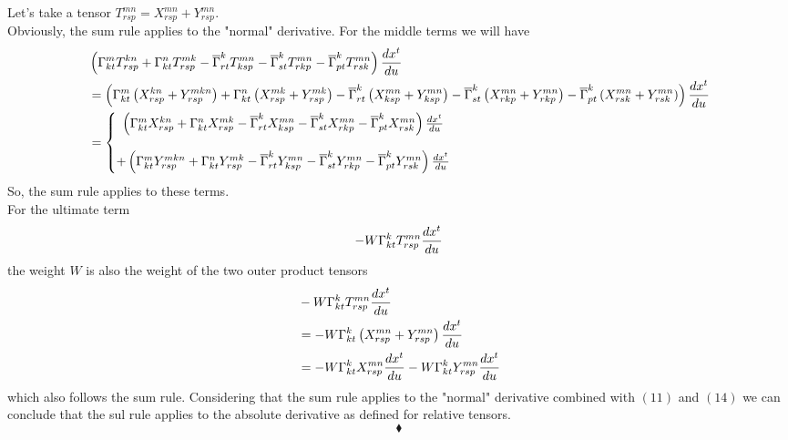 Let's take a tensor $T^{mn}_{rsp} =X^{mn}_{rsp}+Y^{mn}_{rsp}$.\\
Obviously, the sum rule applies to the "normal" derivative.
For the middle terms we will have
\begin{align}
&\left(\Gamma^m_{kt}T^{kn}_{rsp}+\Gamma^n_{kt}T^{mk}_{rsp}-\overline{\Gamma}^k_{rt}T^{mn}_{ksp} -\overline{\Gamma}^k_{st}T^{mn}_{rkp} -\overline{\Gamma}^k_{pt}T^{mn}_{rsk} \right)\dv{x^t}{u}\\
&= \left(\Gamma^m_{kt}\left(X^{kn}_{rsp}+Y^{mkn}_{rsp}\right)+\Gamma^n_{kt}\left(X^{mk}_{rsp}+Y^{mk}_{rsp}\right)-\overline{\Gamma}^k_{rt}\left(X^{mn}_{ksp}+Y^{mn}_{ksp}\right) -\overline{\Gamma}^k_{st}\left(X^{mn}_{rkp}+Y^{mn}_{rkp}\right) -\overline{\Gamma}^k_{pt}\left(X^{mn}_{rsk}+Y^{mn}_{rsk}\right) \right)\dv{x^t}{u}\\
&= \left\{\begin{matrix}
\left(\Gamma^m_{kt}X^{kn}_{rsp}+\Gamma^n_{kt}X^{mk}_{rsp}-\overline{\Gamma}^k_{rt}X^{mn}_{ksp} -\overline{\Gamma}^k_{st}X^{mn}_{rkp} -\overline{\Gamma}^k_{pt}X^{mn}_{rsk} \right)\dv{x^t}{u}\\\\
+ \left(\Gamma^m_{kt}Y^{mkn}_{rsp}+\Gamma^n_{kt}Y^{mk}_{rsp}-\overline{\Gamma}^k_{rt}Y^{mn}_{ksp} -\overline{\Gamma}^k_{st}Y^{mn}_{rkp}-\overline{\Gamma}^k_{pt}Y^{mn}_{rsk}\right)\dv{x^t}{u}
\end{matrix}\right.
\end{align}
So, the sum rule applies to these terms.\\
For the ultimate term 
$$-W\Gamma^k_{kt}T^{mn}_{rsp}\dv{x^t}{u}$$ the weight $W$ is also the weight of the two  outer product tensors
\begin{align}
&-W\Gamma^k_{kt}T^{mn}_{rsp}\dv{x^t}{u}\\
&= 
-W\Gamma^k_{kt}\left(X^{mn}_{rsp}+Y^{mn}_{rsp}\right)\dv{x^t}{u}\\
&= 
-W\Gamma^k_{kt}X^{mn}_{rsp}\dv{x^t}{u}-W\Gamma^k_{kt}Y^{mn}_{rsp}\dv{x^t}{u}
\end{align}
which also follows the sum rule. 
Considering that the sum  rule applies to the "normal" derivative combined with $(11)$ and $(14)$ we can conclude that the sul rule applies to the absolute derivative as defined for relative tensors.
$$\blacklozenge$$ 
\newpage



